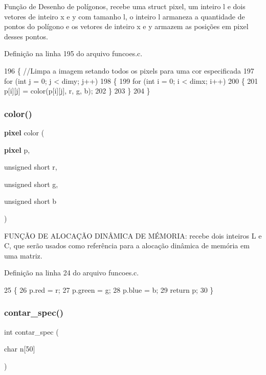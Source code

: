 Função de Desenho de polígonos, recebe uma struct pixel, um inteiro l e dois vetores de inteiro x e y com tamanho l, o inteiro l armaneza a quantidade de pontos do polígono e os vetores de inteiro x e y armazem as posições em pixel desses pontos. 



Definição na linha 195 do arquivo funcoes.\+c.


\begin{DoxyCode}
196 \{ \textcolor{comment}{//Limpa a imagem setando todos os pixels para uma cor especificada}
197     \textcolor{keywordflow}{for} (\textcolor{keywordtype}{int} j = 0; j < dimy; j++)
198     \{
199         \textcolor{keywordflow}{for} (\textcolor{keywordtype}{int} i = 0; i < dimx; i++)
200         \{
201             p[i][j] = color(p[i][j], r, g, b);
202         \}
203     \}
204 \}
\end{DoxyCode}
\mbox{\label{funcoes_8c_ad177adc333f3b3216ad99954f57dcde0}} 
\subsubsection{color()}
{\footnotesize\ttfamily \textbf{ pixel} color (\begin{DoxyParamCaption}\item[{\textbf{ pixel}}]{p,  }\item[{unsigned short}]{r,  }\item[{unsigned short}]{g,  }\item[{unsigned short}]{b }\end{DoxyParamCaption})}



F\+U\+NÇÃO DE A\+L\+O\+C\+AÇÃO D\+I\+NÂ\+M\+I\+CA DE MÉ\+M\+O\+R\+IA\+: recebe dois inteiros L e C, que serão usados como referência para a alocação dinâmica de memória em uma matriz. 



Definição na linha 24 do arquivo funcoes.\+c.


\begin{DoxyCode}
25 \{
26     p.red = r;
27     p.green = g;
28     p.blue = b;
29     \textcolor{keywordflow}{return} p;
30 \}
\end{DoxyCode}
\mbox{\label{funcoes_8c_a5f3b3425ca4ce2be5043883294c4e497}} 
\subsubsection{contar\+\_\+spec()}
{\footnotesize\ttfamily int contar\+\_\+spec (\begin{DoxyParamCaption}\item[{char}]{n[50] }\end{DoxyParamCaption})}



